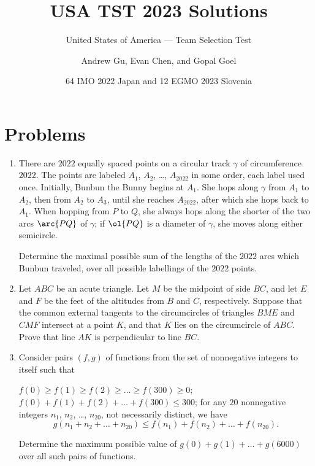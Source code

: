 \documentclass[11pt]{scrartcl}
\begin{document}
\title{USA TST 2023 Solutions}
\subtitle{United States of America --- Team Selection Test}
\author{Andrew Gu, Evan Chen, and Gopal Goel}
\date{64 IMO 2022 Japan and 12 EGMO 2023 Slovenia}

\maketitle

\tableofcontents
\newpage

\addtocounter{section}{-1}
\section{Problems}
\begin{enumerate}[\bfseries 1.]
\item %
There are $2022$ equally spaced points
on a circular track $\gamma$ of circumference $2022$.
The points are labeled $A_1$, $A_2$, \dots, $A_{2022}$ in some order, each label used once.
Initially, Bunbun the Bunny begins at $A_1$.
She hops along $\gamma$ from $A_1$ to $A_2$, then from $A_2$ to $A_3$,
until she reaches $A_{2022}$, after which she hops back to $A_1$.
When hopping from $P$ to $Q$, she always hops along the
shorter of the two arcs $\arc{PQ}$ of $\gamma$;
if $\ol{PQ}$ is a diameter of $\gamma$, she moves along either semicircle.

Determine the maximal possible sum of the lengths of the $2022$ arcs
which Bunbun traveled, over all possible labellings of the $2022$ points.

\item %
Let $ABC$ be an acute triangle.
Let $M$ be the midpoint of side $BC$,
and let $E$ and $F$ be the feet of the altitudes from $B$ and $C$, respectively.
Suppose that the common external tangents
to the circumcircles of triangles $BME$ and $CMF$ intersect at a point $K$,
and that $K$ lies on the circumcircle of $ABC$.
Prove that line $AK$ is perpendicular to line $BC$.

\item %
Consider pairs $(f,g)$ of functions
from the set of nonnegative integers to itself such that
\begin{itemize}
		\ii $f(0) \ge f(1) \ge f(2) \ge \dots \ge f(300) \ge 0$;
		\ii $f(0) + f(1) + f(2) + \dots + f(300) \leq 300$;
		\ii for any $20$ nonnegative integers $n_1$, $n_2$, \dots, $n_{20}$,
		not necessarily distinct, we have
		\[ g(n_1 + n_2 + \dots + n_{20}) \leq f(n_1) + f(n_2) + \dots + f(n_{20}). \]
\end{itemize}
Determine the maximum possible value of $g(0) + g(1) + \dots + g(6000)$
over all such pairs of functions.


\end{enumerate}
\end{document}
